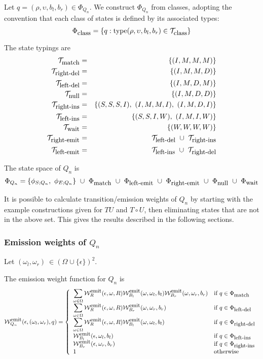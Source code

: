\documentclass{article}
\newcommand\gappedalphabet[1]{(\Omega_{#1} \cup \{\epsilon\})}
\newcommand\gapsquared{\gappedalphabet{}^2}
\newcommand\compose{}
\newcommand\fork{\circ}
\newcommand\States{\Phi}
\newcommand\statesof[1]{\States_{#1}}
\newcommand\startstateof[1]{\phi_{S;#1}}
\newcommand\laststateof[1]{\phi_{E;#1}}
\newcommand\weight{{\cal W}}
\newcommand\weightfunof[1]{\weight_{#1}}
\newcommand\emitweightfun[1]{\weightfunof{#1}^{\mbox{\small emit}}}
\newcommand\statetype{\mbox{type}}
\newcommand\typeset[1]{{\cal T}_{\mbox{\small #1}}}
\newcommand\stateset[1]{\statesof{\mbox{\small #1}}}
\newcommand\qstate{(\rho,\upsilon,b_l,b_r)}
\newcommand\matchsuffix{match}
\newcommand\nullsuffix{null}
\newcommand\leftinsertsuffix{left-ins}
\newcommand\rightinsertsuffix{right-ins}
\newcommand\leftdeletesuffix{left-del}
\newcommand\rightdeletesuffix{right-del}
\newcommand\leftemitsuffix{left-emit}
\newcommand\rightemitsuffix{right-emit}
\newcommand\qwaitsuffix{wait}
\newcommand\matchstates{\stateset{\matchsuffix}}
\newcommand\nullstates{\stateset{\nullsuffix}}
\newcommand\leftinsertstates{\stateset{\leftinsertsuffix}}
\newcommand\rightinsertstates{\stateset{\rightinsertsuffix}}
\newcommand\leftdeletestates{\stateset{\leftdeletesuffix}}
\newcommand\rightdeletestates{\stateset{\rightdeletesuffix}}
\newcommand\leftemitstates{\stateset{\leftemitsuffix}}
\newcommand\rightemitstates{\stateset{\rightemitsuffix}}
\newcommand\qwaitstates{\stateset{\qwaitsuffix}}
\newcommand\matchtypes{\typeset{\matchsuffix}}
\newcommand\nulltypes{\typeset{\nullsuffix}}
\newcommand\leftinserttypes{\typeset{\leftinsertsuffix}}
\newcommand\rightinserttypes{\typeset{\rightinsertsuffix}}
\newcommand\leftdeletetypes{\typeset{\leftdeletesuffix}}
\newcommand\rightdeletetypes{\typeset{\rightdeletesuffix}}
\newcommand\leftemittypes{\typeset{\leftemitsuffix}}
\newcommand\rightemittypes{\typeset{\rightemitsuffix}}
\newcommand\qwaittypes{\typeset{\qwaitsuffix}}
\begin{document}
Let $q=\qstate\in\statesof{Q_n}$.
We construct $\statesof{Q_n}$ from classes, adopting the convention that each class of states is defined by its associated types:
\[
\stateset{class} = \{ q: \statetype\qstate \in \typeset{class} \}
\]

The state typings are
\begin{eqnarray*}
\matchtypes & = & \{ (I,M,M,M) \}  \\
\rightdeletetypes & = & \{ (I,M,M,D) \}  \\
\leftdeletetypes & = & \{ (I,M,D,M) \}  \\
\nulltypes & = & \{ (I,M,D,D) \}  \\
\rightinserttypes & = & \{ (S,S,S,I),\ (I,M,M,I),\ (I,M,D,I) \}  \\
\leftinserttypes & = & \{ (S,S,I,W),\ (I,M,I,W) \}  \\
\qwaittypes & = & \{ (W,W,W,W) \} \\
\rightemittypes & = & \leftdeletetypes\ \cup\ \rightinserttypes \\
\leftemittypes & = & \leftinserttypes\ \cup\ \rightdeletetypes
\end{eqnarray*}

The state space of $Q_n$ is
\[
\statesof{Q_n} = \{ \startstateof{Q_n},\ \laststateof{Q_n} \}\ \cup\ \matchstates\ \cup\ \leftemitstates\ \cup\ \rightemitstates\ \cup\ \nullstates\ \cup\ \qwaitstates
\]

It is possible to calculate transition/emission weights of $Q_n$
by starting with the example constructions given for $T \compose U$ and $T \fork U$,
then eliminating states that are not in the above set.
This gives the results described in the following sections.

\subsubsection{Emission weights of $Q_n$}

Let $(\omega_l,\omega_r)\ \in \gapsquared$.

The emission weight function for $Q_n$ is
\[
\emitweightfun{Q_n}(\epsilon,(\omega_l,\omega_r),q) = \left\{
\begin{array}{ll}
\displaystyle
\sum_{\omega \in \Omega} \emitweightfun{R}(\epsilon,\omega,R)
 \emitweightfun{B_l}(\omega,\omega_l,b_l)
 \emitweightfun{B_r}(\omega,\omega_r,b_r)
 & \mbox{if $q \in \matchstates$} \\
\displaystyle
\sum_{\omega \in \Omega} \emitweightfun{R}(\epsilon,\omega,R)
 \emitweightfun{B_r}(\omega,\omega_r,b_r)
 & \mbox{if $q \in \leftdeletestates$} \\
\displaystyle
\sum_{\omega \in \Omega} \emitweightfun{R}(\epsilon,\omega,R)
 \emitweightfun{B_l}(\omega,\omega_l,b_l)
 & \mbox{if $q \in \rightdeletestates$} \\
 \emitweightfun{B_l}(\epsilon,\omega_l,b_l)
 & \mbox{if $q \in \leftinsertstates$} \\
 \emitweightfun{B_r}(\epsilon,\omega_r,b_r)
 & \mbox{if $q \in \rightinsertstates$} \\
1
 & \mbox{otherwise}
\end{array}
\right.
\]
\end{document}
